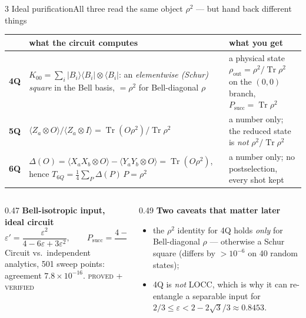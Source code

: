 \documentclass[aspectratio=169,10pt,t]{beamer}
\newcommand{\rowgap}{\addlinespace[1.2pt]}
\newcommand{\bra}[1]{\langle #1 \rvert}
\newcommand{\ketbra}[2]{\lvert #1 \rangle\langle #2 \rvert}
\newcommand{\avg}[1]{\langle #1 \rangle}
\newcommand{\Tr}{\operatorname{Tr}}
\newcommand{\acc}[1]{{\color{qitaccent}#1}}
\newcommand{\stat}[1]{{\scriptsize\color{qitgray}\textsc{#1}}}
\begin{document}
\begin{frame}{3 \quad Ideal purification}{All three read the same object $\rho^{2}$ --- but hand back different things}
  \vspace{0.6ex}
  \scriptsize
  \setlength{\tabcolsep}{4pt}\begin{tabular}{@{}p{} p{} p{}@{}}
    \toprule
    & \textbf{what the circuit computes} & \textbf{what you get}\\
    \midrule
    \textbf{4Q}
      & $K_{00}=\sum_{i}\ketbra{B_i}{B_i}\otimes\bra{B_i}$: an
        \emph{elementwise (Schur) square} in the Bell basis, $=\rho^{2}$
        for Bell-diagonal $\rho$
      & \acc{a physical state}
        $\rho_{\mathrm{out}}=\rho^{2}/\Tr\rho^{2}$ on the $(0,0)$ branch,
        $P_{\mathrm{succ}}=\Tr\rho^{2}$\\\rowgap
    \textbf{5Q}
      & $\avg{Z_a\otimes O}/\avg{Z_a\otimes I}=\Tr(O\rho^{2})/\Tr\rho^{2}$
      & \acc{a number only}; the reduced state is \emph{not}
        $\rho^{2}/\Tr\rho^{2}$\\\rowgap
    \textbf{6Q}
      & $\Delta(O)=\avg{X_aX_b\otimes O}-\avg{Y_aY_b\otimes O}=\Tr(O\rho^{2})$,
        hence $T_{6Q}=\tfrac14\sum_{P}\Delta(P)\,P=\rho^{2}$
      & \acc{a number only}; no postselection, every shot kept\\
    \bottomrule
  \end{tabular}

  \vspace{2.0ex}
  \footnotesize
  \begin{columns}[T,onlytextwidth]
  \begin{column}{0.47\textwidth}\vspace{0pt}
    \textbf{Bell-isotropic input, ideal circuit}
    \[
      \varepsilon'=\frac{\varepsilon^{2}}{4-6\varepsilon+3\varepsilon^{2}},
      \qquad
      P_{\mathrm{succ}}=\frac{4-6\varepsilon+3\varepsilon^{2}}{4}
    \]
    \smallskip
    Circuit vs.\ independent analytics, 501 sweep points:
    agreement \acc{$7.8\times10^{-16}$}.\; \stat{proved + verified}
  \end{column}
  \begin{column}{0.49\textwidth}\vspace{0pt}
    \textbf{Two caveats that matter later}
    \begin{itemize}\itemsep0.35ex
      \item the $\rho^{2}$ identity for 4Q holds \emph{only} for
            Bell-diagonal $\rho$ --- otherwise a Schur square (differs by
            ${>}10^{-6}$ on 40 random states);
      \item 4Q is \emph{not} LOCC, which is why it can re-entangle a
            separable input for
            $2/3\le\varepsilon<2-2\sqrt3/3\approx0.8453$.
    \end{itemize}
  \end{column}
  \end{columns}
\end{frame}
\end{document}
